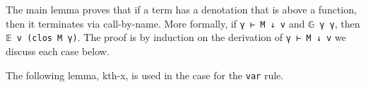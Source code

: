The main lemma proves that if a term has a denotation that is above a
function, then it terminates via call-by-name. More formally, if
\texttt{γ\ ⊢\ M\ ↓\ v} and \texttt{𝔾\ γ\ γ\textquotesingle{}}, then
\texttt{𝔼\ v\ (clos\ M\ γ\textquotesingle{})}. The proof is by induction
on the derivation of \texttt{γ\ ⊢\ M\ ↓\ v} we discuss each case below.

The following lemma, kth-x, is used in the case for the \texttt{var}
rule.

\begin{fence}
\begin{code}%
\>[0]\AgdaSpace{}%
\AgdaSymbol{:}\AgdaSpace{}%
\AgdaSymbol{\}\{}\AgdaSpace{}%
\AgdaSymbol{:}\AgdaSpace{}%
\AgdaSpace{}%
\AgdaSymbol{\}\{}\AgdaSpace{}%
\AgdaSymbol{:}\AgdaSpace{}%
\AgdaSpace{}%
\AgdaSpace{}%
\AgdaSymbol{\}}\<%
\\
\>[0][@{}l@{\AgdaIndent{0}}]%
\>[5]\AgdaSpace{}%
\AgdaFunction{Σ[}\AgdaSpace{}%
\AgdaSpace{}%
%
\>[1368I]\AgdaSpace{}%
\AgdaFunction{]}\AgdaSpace{}%
\AgdaFunction{Σ[}\AgdaSpace{}%
\AgdaSpace{}%
\AgdaSpace{}%
\AgdaSpace{}%
\AgdaSpace{}%
\AgdaFunction{]}\AgdaSpace{}%
\AgdaFunction{Σ[}\AgdaSpace{}%
\AgdaSpace{}%
\AgdaSpace{}%
\AgdaSpace{}%
\AgdaSpace{}%
\AgdaSpace{}%
\AgdaFunction{]}\<%
\\
\>[1368I][@{}l@{\AgdaIndent{0}}]%
\>[17]\AgdaSpace{}%
\AgdaSpace{}%
\AgdaSpace{}%
\AgdaSpace{}%
\AgdaSpace{}%
\<%
\\
\>[0]\AgdaSymbol{\{}\AgdaSpace{}%
\AgdaSymbol{=}\AgdaSpace{}%
\AgdaSymbol{\}\{}\AgdaSpace{}%
\AgdaSymbol{=}\AgdaSpace{}%
\AgdaSymbol{\}}\AgdaSpace{}%
\AgdaSpace{}%
\AgdaSpace{}%
\<%
\\
\>[0]\AgdaSpace{}%
\AgdaSymbol{|}\AgdaSpace{}%
\AgdaSymbol{\{}\AgdaSpace{}%
\AgdaSymbol{=}\AgdaSpace{}%
\AgdaSymbol{\}}\AgdaSpace{}%
\AgdaSpace{}%
\AgdaSpace{}%

\end{code}
\end{fence}
